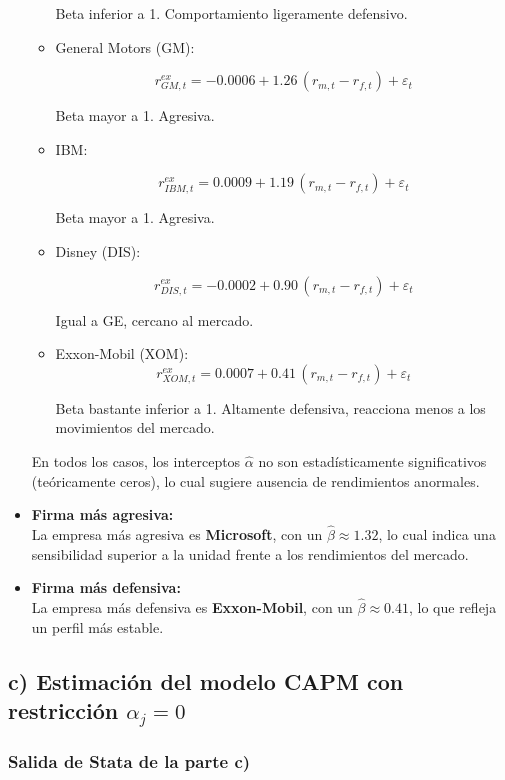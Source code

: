 \documentclass[12pt]{article}
\begin{document}
\begin{itemize}
\begin{itemize}
    Beta inferior a 1. Comportamiento ligeramente defensivo.
    
    \item General Motors (GM): 
    
    \[
      r_{GM,t}^{ex} = -0.0006 + 1.26 \,(r_{m,t} - r_{f,t}) + \varepsilon_t
    \] 
    
    Beta mayor a 1. Agresiva.
    \item IBM: 
    
    \[
      r_{IBM,t}^{ex} = 0.0009 + 1.19 \,(r_{m,t} - r_{f,t}) + \varepsilon_t
    \] 
    
    Beta mayor a 1. Agresiva.
    \item Disney (DIS): 
    
    \[
      r_{DIS,t}^{ex} = -0.0002 + 0.90 \,(r_{m,t} - r_{f,t}) + \varepsilon_t
    \]
    
    Igual a GE, cercano al mercado.
    
    \item Exxon-Mobil (XOM): \[
      r_{XOM,t}^{ex} = 0.0007 + 0.41 \,(r_{m,t} - r_{f,t}) + \varepsilon_t
    \]
    
    Beta bastante inferior a 1. Altamente defensiva, reacciona menos a los movimientos del mercado.
  \end{itemize}
  
  En todos los casos, los interceptos $\hat\alpha$ no son estadísticamente significativos (teóricamente ceros), lo cual sugiere ausencia de rendimientos anormales.

  \item \textbf{Firma más agresiva:} \\
  La empresa más agresiva es \textbf{Microsoft}, con un $\hat\beta \approx 1.32$, lo cual indica una sensibilidad superior a la unidad frente a los rendimientos del mercado.

  \item \textbf{Firma más defensiva:} \\
  La empresa más defensiva es \textbf{Exxon-Mobil}, con un $\hat\beta \approx 0.41$, lo que refleja un perfil más estable.
\end{itemize}

\subsection*{c) Estimación del modelo CAPM con restricción $\alpha_j = 0$}

\subsubsection*{Salida de Stata de la parte c)}
\end{document}
